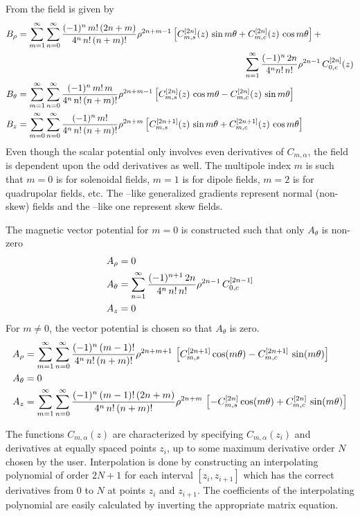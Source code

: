 From  the field is given by
\begin{align}
  B_\rho   &= \sum_{m = 1}^{\infty} \sum_{n = 0}^\infty \frac{(-1)^n \, m! \, (2n+m)}{4^n \, n! \, (n+m)!}
    \rho^{2n+m-1} \left[ C^{[2n]}_{m,s}(z) \, \sin m\theta + C^{[2n]}_{m,c}(z) \, \cos m\theta \right] + \CRNO
    & \hspace{25 em} \sum_{n = 1}^\infty \frac{(-1)^n \, 2n}{4^n n! \, n!} \rho^{2n-1} \, C^{[2n]}_{0,c}(z) \CRNO
  B_\theta &= \sum_{m = 1}^{\infty} \sum_{n = 0}^\infty \frac{(-1)^n \, m! \, m}{4^n \, n! \, (n+m)!}
    \rho^{2n+m-1} \left[ C^{[2n]}_{m,s}(z) \, \cos m\theta - C^{[2n]}_{m,c}(z) \, \sin m\theta \right] \\
  B_z      &= \sum_{m = 0}^{\infty} \sum_{n = 0}^\infty \frac{(-1)^n \, m!}{4^n \, n! \, (n+m)!}
    \rho^{2n+m} \left[ C^{[2n+1]}_{m,s}(z) \, \sin m\theta + C^{[2n+1]}_{m,c}(z) \, \cos m\theta \right] \nonumber
\end{align}
Even though the scalar potential only involves even derivatives of $C_{m,\alpha}$, the field is
dependent upon the odd derivatives as well. The multipole index $m$ is such that $m = 0$ is for
solenoidal fields, $m = 1$ is for dipole fields, $m = 2$ is for quadrupolar fields, etc. The
--like generalized gradients represent normal (non-skew) fields and the --like one
represent skew fields.

The magnetic vector potential for $m = 0$ is constructed such that only $A_\theta$ is non-zero
\begin{align}
  A_\rho   &= 0 \nonumber \\
  A_\theta &= \sum_{n=1}^\infty 
    \frac{(-1)^{n+1} \, 2n}{4^n \, n! \, n!} \rho^{2n-1} \, C_{0,c}^{[2n-1]} \\
  A_z      &= 0 \nonumber
\end{align}
For $m \ne 0$, the vector potential is chosen so that $A_\theta$ is zero.
\begin{align}
  A_\rho   &= \sum_{m = 1}^{\infty} \sum_{n=0}^\infty 
    \frac{(-1)^{n} \, (m-1)!}{4^n \, n! \, (n+m)!} \rho^{2n+m+1} \, 
    \left[ C_{m,s}^{[2n+1]} \cos(m \theta) - C_{m,c}^{[2n+1]} \, \sin(m \theta) \right] \nonumber \\ 
  A_\theta &= 0 \\
  A_z      &= \sum_{m = 1}^{\infty} \sum_{n=0}^\infty 
    \frac{(-1)^n \, (m-1)! \, (2n+m)}{4^n \, n! \, (n+m)!} \rho^{2n+m} \, 
    \left[ -C_{m,s}^{[2n]} \cos(m \theta) + C_{m,c}^{[2n]} \, \sin(m \theta) \right]
  \nonumber
\end{align}

The functions $C_{m,\alpha}(z)$ are characterized by specifying $C_{m,\alpha}(z_i)$ and derivatives
at equally spaced points $z_i$, up to some maximum derivative order $N$ chosen by the
user. Interpolation is done by constructing an interpolating polynomial of order $2N+1$ for each
interval $[z_i, z_{i+1}]$ which has the correct derivatives from $0$ to $N$ at points $z_i$ and
$z_{i+1}$. The coefficients of the interpolating polynomial are easily calculated by inverting the
appropriate matrix equation.


